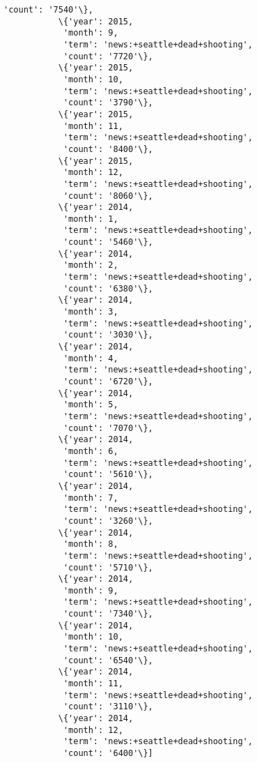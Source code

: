 \documentclass[11pt]{article}
\begin{document}
\begin{Verbatim}[commandchars=\\\{\}]
            'count': '7540'\},
           \{'year': 2015,
            'month': 9,
            'term': 'news:+seattle+dead+shooting',
            'count': '7720'\},
           \{'year': 2015,
            'month': 10,
            'term': 'news:+seattle+dead+shooting',
            'count': '3790'\},
           \{'year': 2015,
            'month': 11,
            'term': 'news:+seattle+dead+shooting',
            'count': '8400'\},
           \{'year': 2015,
            'month': 12,
            'term': 'news:+seattle+dead+shooting',
            'count': '8060'\},
           \{'year': 2014,
            'month': 1,
            'term': 'news:+seattle+dead+shooting',
            'count': '5460'\},
           \{'year': 2014,
            'month': 2,
            'term': 'news:+seattle+dead+shooting',
            'count': '6380'\},
           \{'year': 2014,
            'month': 3,
            'term': 'news:+seattle+dead+shooting',
            'count': '3030'\},
           \{'year': 2014,
            'month': 4,
            'term': 'news:+seattle+dead+shooting',
            'count': '6720'\},
           \{'year': 2014,
            'month': 5,
            'term': 'news:+seattle+dead+shooting',
            'count': '7070'\},
           \{'year': 2014,
            'month': 6,
            'term': 'news:+seattle+dead+shooting',
            'count': '5610'\},
           \{'year': 2014,
            'month': 7,
            'term': 'news:+seattle+dead+shooting',
            'count': '3260'\},
           \{'year': 2014,
            'month': 8,
            'term': 'news:+seattle+dead+shooting',
            'count': '5710'\},
           \{'year': 2014,
            'month': 9,
            'term': 'news:+seattle+dead+shooting',
            'count': '7340'\},
           \{'year': 2014,
            'month': 10,
            'term': 'news:+seattle+dead+shooting',
            'count': '6540'\},
           \{'year': 2014,
            'month': 11,
            'term': 'news:+seattle+dead+shooting',
            'count': '3110'\},
           \{'year': 2014,
            'month': 12,
            'term': 'news:+seattle+dead+shooting',
            'count': '6400'\}]
\end{Verbatim}
            

    
    
    
    
\end{document}
